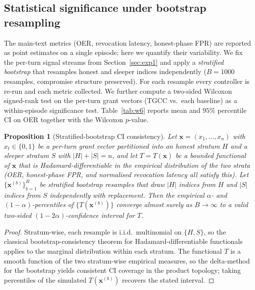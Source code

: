 \documentclass[sigconf,anonymous]{acmart}
\theoremstyle{plain}
\newtheorem{proposition}{Proposition}
\theoremstyle{definition}
\theoremstyle{remark}
\begin{document}
\subsection{Statistical significance under bootstrap resampling}
\label{app:w6}
The main-text metrics (OER, revocation latency, honest-phase FPR) are
reported as point estimates on a single episode; here we quantify their
variability.  We fix the per-turn signal streams from
Section~\ref{sec:exp1} and apply a \emph{stratified bootstrap} that
resamples honest and sleeper indices independently ($B=1000$ resamples,
compromise structure preserved).  For each resample every controller is
re-run and each metric collected.  We further compute a two-sided
Wilcoxon signed-rank test on the per-turn grant vectors (TGCC vs.\ each
baseline) as a within-episode significance test.  Table~\ref{tab:w6}
reports mean and $95\%$ percentile CI on OER together with the Wilcoxon
$p$-value.

\begin{proposition}[Stratified-bootstrap CI consistency]
\label{prop:w6}
Let $\mathbf{x}=(x_1,\dots,x_n)$ with $x_t\in\{0,1\}$ be a per-turn grant
vector partitioned into an honest stratum $H$ and a sleeper stratum $S$
with $|H|+|S|=n$, and let $T=T(\mathbf{x})$ be a bounded functional of
$\mathbf{x}$ that is Hadamard-differentiable in the empirical
distribution of the two strata (OER, honest-phase FPR, and normalised
revocation latency all satisfy this).  Let $\{\mathbf{x}^{(b)}\}_{b=1}^B$
be stratified bootstrap resamples that draw $|H|$ indices from $H$ and
$|S|$ indices from $S$ independently with replacement.  Then the
empirical $\alpha$- and $(1-\alpha)$-percentiles of $\{T(\mathbf{x}^{(b)})\}$
converge almost surely as $B\to\infty$ to a valid two-sided
$(1-2\alpha)$-confidence interval for $T$.
\end{proposition}

\begin{proof}
Stratum-wise, each resample is i.i.d.\ multinomial on $\{H,S\}$, so the
classical bootstrap-consistency theorem for Hadamard-differentiable
functionals applies to the marginal distribution within each stratum.
The functional $T$ is a smooth function of the two stratum-wise
empirical measures, so the delta-method for the bootstrap yields
consistent CI coverage in the product topology; taking percentiles of
the simulated $T(\mathbf{x}^{(b)})$ recovers the stated interval.
\end{proof}
\end{document}
